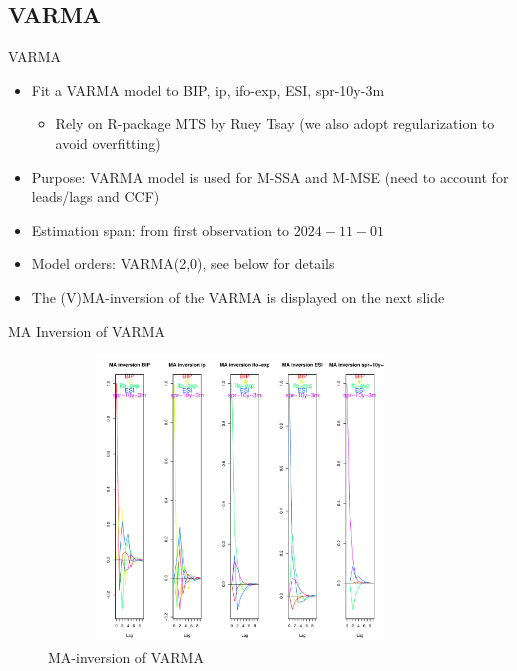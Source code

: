 \documentclass{beamer}
\begin{document}
\subsection{VARMA}

\begin{frame} {VARMA}
\begin{itemize}
\item Fit a VARMA model to BIP, ip, ifo-exp, ESI, spr-10y-3m
\begin{itemize}
\item Rely on R-package MTS by Ruey Tsay (we also adopt regularization to avoid overfitting)
\end{itemize}
\item Purpose: VARMA model is used for M-SSA and M-MSE (need to account for leads/lags and CCF)
\item Estimation span: from first observation to $2024-11-01$
\item Model orders: VARMA(2,0), see below for details 
\item The (V)MA-inversion of the VARMA is displayed on the next slide
\end{itemize}

\end{frame}


\begin{frame} {MA Inversion of VARMA}
\begin{figure}[H]\begin{center}\includegraphics[height=3in, width=4in]{ma_inv_multi_ip.pdf}\caption{MA-inversion of VARMA\label{cor}}\end{center}\end{figure}\end{frame}
\end{document}
